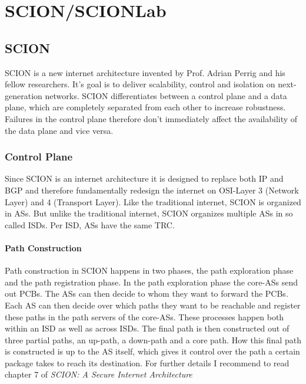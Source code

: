 \chapter{SCION/SCIONLab}

\section{SCION}
\acs{SCION} is a new internet architecture invented by Prof. Adrian Perrig and his fellow researchers. It's goal is to deliver scalability, control and isolation on next-generation networks. \acs{SCION} differentiates between a control plane and a data plane, which are completely separated from each other to increase robustness. Failures in the control plane therefore don't immediately affect the availability of the data plane and vice versa.

\subsection{Control Plane}
Since \acs{SCION} is an internet architecture it is designed to replace both \acs{IP} and \acs{BGP} and therefore fundamentally redesign the internet on \ac{OSI}-Layer 3 (Network Layer) and 4 (Transport Layer). Like the traditional internet, \acs{SCION} is organized in \aclp{AS}. But unlike the traditional internet, \acs{SCION} organizes multiple \acsp{AS} in so called \aclp{ISD}. Per \ac{ISD}, \acsp{AS} have the same \acl{TRC}.

\subsubsection{Path Construction}
Path construction in \acs{SCION} happens in two phases, the path exploration phase and the path registration phase. In the path exploration phase the core-\acsp{AS} send out \acp{PCB}. The \acsp{AS} can then decide to whom they want to forward the \acsp{PCB}. Each \acs{AS} can then decide over which paths they want to be reachable and register these paths in the path servers of the core-\acsp{AS}. These processes happen both within an \acs{ISD} as well as across \acsp{ISD}. The final path is then constructed out of three partial paths, an up-path, a down-path and a core path. How this final path is constructed is up to the \acs{AS} itself, which gives it control over the path a certain package takes to reach its destination. For further details I recommend to read chapter 7 of \textit{SCION: A Secure Internet Architecture} \cite{perrig2017scion}

